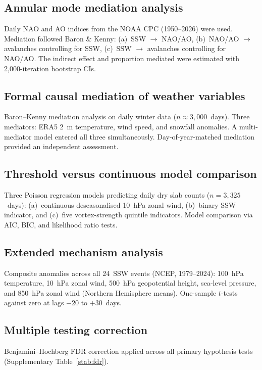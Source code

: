 \documentclass[11pt,a4paper]{article}
\begin{document}
\subsection{Annular mode mediation analysis}

Daily NAO and AO indices from the NOAA CPC (1950--2026) were used. Mediation followed Baron \& Kenny: (a)~SSW $\to$ NAO/AO, (b)~NAO/AO $\to$ avalanches controlling for SSW, (c)~SSW $\to$ avalanches controlling for NAO/AO. The indirect effect and proportion mediated were estimated with 2,000-iteration bootstrap CIs.

\subsection{Formal causal mediation of weather variables}

Baron--Kenny mediation analysis on daily winter data ($n \approx 3{,}000$~days). Three mediators: ERA5 2~m temperature, wind speed, and snowfall anomalies. A multi-mediator model entered all three simultaneously. Day-of-year-matched mediation provided an independent assessment.

\subsection{Threshold versus continuous model comparison}

Three Poisson regression models predicting daily dry slab counts ($n = 3{,}325$~days): (a)~continuous deseasonalised 10~hPa zonal wind, (b)~binary SSW indicator, and (c)~five vortex-strength quintile indicators. Model comparison via AIC, BIC, and likelihood ratio tests.

\subsection{Extended mechanism analysis}

Composite anomalies across all 24~SSW events (NCEP, 1979--2024): 100~hPa temperature, 10~hPa zonal wind, 500~hPa geopotential height, sea-level pressure, and 850~hPa zonal wind (Northern Hemisphere means). One-sample $t$-tests against zero at lags $-20$ to $+30$~days.

\subsection{Multiple testing correction}

Benjamini--Hochberg FDR correction applied across all primary hypothesis tests (Supplementary Table~\ref{stab:fdr}).
\end{document}
